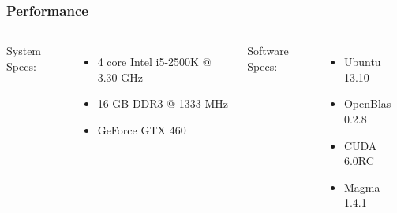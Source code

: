 \documentclass[t]{beamer}\usepackage[]{graphicx}\usepackage[]{color}
\begin{document}
\begin{frame}
\frametitle{Performance}

\vfill

\begin{columns}[t]
System Specs:
\vspace{2.5mm}
\begin{itemize}
\item 4 core Intel i5-2500K @ 3.30 GHz
\vspace{2mm} \item 16 GB DDR3 @ 1333 MHz
\vspace{2mm} \item GeForce GTX 460
\end{itemize}

Software Specs:
\vspace{0.5mm}
\begin{itemize}
\item Ubuntu 13.10
\vspace{2mm} \item OpenBlas 0.2.8
\vspace{2mm} \item CUDA 6.0RC
\vspace{2mm} \item Magma 1.4.1
\end{itemize}
\end{columns}

\vfill

\end{frame}

\end{document}
